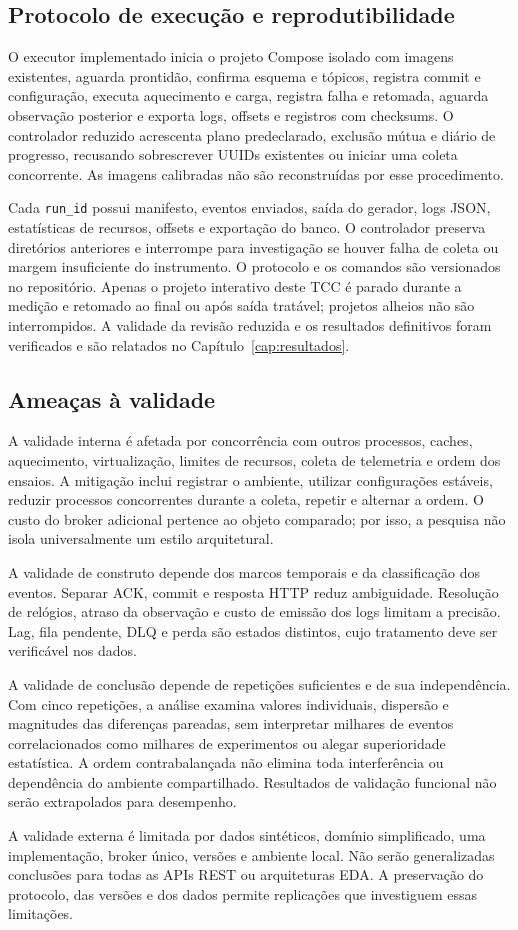 \subsection{Protocolo de execução e reprodutibilidade}
O executor implementado inicia o projeto Compose isolado com imagens existentes, aguarda prontidão, confirma esquema e tópicos, registra commit e configuração, executa aquecimento e carga, registra falha e retomada, aguarda observação posterior e exporta logs, offsets e registros com checksums. O controlador reduzido acrescenta plano predeclarado, exclusão mútua e diário de progresso, recusando sobrescrever UUIDs existentes ou iniciar uma coleta concorrente. As imagens calibradas não são reconstruídas por esse procedimento.

Cada \texttt{run\_id} possui manifesto, eventos enviados, saída do gerador, logs JSON, estatísticas de recursos, offsets e exportação do banco. O controlador preserva diretórios anteriores e interrompe para investigação se houver falha de coleta ou margem insuficiente do instrumento. O protocolo e os comandos são versionados no repositório. Apenas o projeto interativo deste TCC é parado durante a medição e retomado ao final ou após saída tratável; projetos alheios não são interrompidos. A validade da revisão reduzida e os resultados definitivos foram verificados e são relatados no Capítulo~\ref{cap:resultados}.

\subsection{Ameaças à validade}
A validade interna é afetada por concorrência com outros processos, caches, aquecimento, virtualização, limites de recursos, coleta de telemetria e ordem dos ensaios. A mitigação inclui registrar o ambiente, utilizar configurações estáveis, reduzir processos concorrentes durante a coleta, repetir e alternar a ordem. O custo do broker adicional pertence ao objeto comparado; por isso, a pesquisa não isola universalmente um estilo arquitetural.

A validade de construto depende dos marcos temporais e da classificação dos eventos. Separar ACK, commit e resposta HTTP reduz ambiguidade. Resolução de relógios, atraso da observação e custo de emissão dos logs limitam a precisão. Lag, fila pendente, DLQ e perda são estados distintos, cujo tratamento deve ser verificável nos dados.

A validade de conclusão depende de repetições suficientes e de sua independência. Com cinco repetições, a análise examina valores individuais, dispersão e magnitudes das diferenças pareadas, sem interpretar milhares de eventos correlacionados como milhares de experimentos ou alegar superioridade estatística. A ordem contrabalançada não elimina toda interferência ou dependência do ambiente compartilhado. Resultados de validação funcional não serão extrapolados para desempenho.

A validade externa é limitada por dados sintéticos, domínio simplificado, uma implementação, broker único, versões e ambiente local. Não serão generalizadas conclusões para todas as APIs REST ou arquiteturas EDA. A preservação do protocolo, das versões e dos dados permite replicações que investiguem essas limitações.
